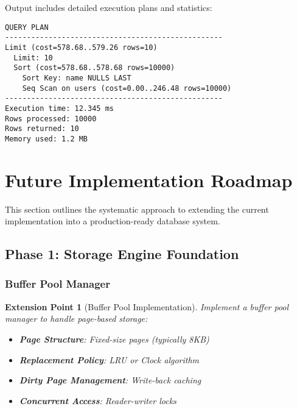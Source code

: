 \documentclass[12pt,a4paper]{article}
\newtheorem{extension}{Extension Point}[section]
\begin{document}
Output includes detailed execution plans and statistics:

\begin{lstlisting}[caption=Example Execution Plan Output]
QUERY PLAN
--------------------------------------------------
Limit (cost=578.68..579.26 rows=10)
  Limit: 10
  Sort (cost=578.68..578.68 rows=10000)
    Sort Key: name NULLS LAST
    Seq Scan on users (cost=0.00..246.48 rows=10000)
--------------------------------------------------
Execution time: 12.345 ms
Rows processed: 10000
Rows returned: 10
Memory used: 1.2 MB
\end{lstlisting}

\section{Future Implementation Roadmap}

This section outlines the systematic approach to extending the current implementation into a production-ready database system.

\subsection{Phase 1: Storage Engine Foundation}

\subsubsection{Buffer Pool Manager}

\begin{extension}[Buffer Pool Implementation]
Implement a buffer pool manager to handle page-based storage:

\begin{itemize}
    \item \textbf{Page Structure}: Fixed-size pages (typically 8KB)
    \item \textbf{Replacement Policy}: LRU or Clock algorithm
    \item \textbf{Dirty Page Management}: Write-back caching
    \item \textbf{Concurrent Access}: Reader-writer locks
\end{itemize}
\end{extension}
\end{document}

